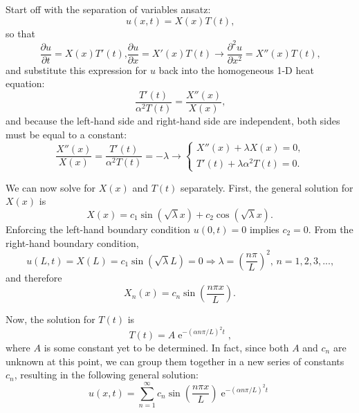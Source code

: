 \documentclass{article}
\begin{document}
Start off with the separation of variables ansatz:
\begin{equation}
u(x,t) = X(x)T(t)\text{,}
\end{equation}
so that
\begin{subequations}
\begin{equation}
\frac{\partial u}{\partial t} = X(x)T'(t)\text{,}
\end{equation}
\begin{equation}
\frac{\partial u}{\partial x} = X'(x)T(t)\rightarrow \frac{\partial^2 u}{\partial x^2} = X''(x)T(t)\text{,}
\end{equation}
\end{subequations}
and substitute this expression for $u$ back into the homogeneous 1-D heat equation:
\begin{equation}
\frac{T'(t)}{\alpha^2 T(t)} = \frac{X''(x)}{X(x)}\text{,}
\end{equation}
and because the left-hand side and right-hand side are independent, both sides must be equal to a constant:
\begin{equation}
\frac{X''(x)}{X(x)} = \frac{T'(t)}{\alpha^2 T(t)} = -\lambda \rightarrow
\begin{cases}
X''(x) + \lambda X(x) = 0\text{,}\\
T'(t) + \lambda \alpha^2 T(t) = 0\text{.}
\end{cases}
\end{equation}

We can now solve for $X(x)$ and $T(t)$ separately. First, the general solution for $X(x)$ is
\begin{equation}
X(x) = c_1\sin\left(\sqrt{\lambda}x\right) + c_2\cos\left(\sqrt{\lambda}x\right)\text{.}
\end{equation}
Enforcing the left-hand boundary condition $u(0,t) = 0$ implies $c_2 = 0$. From the right-hand boundary condition,
\begin{equation}
u(L,t) = X(L) = c_1\sin\left(\sqrt{\lambda}L\right) = 0\Rightarrow\lambda = \left(\frac{n\pi}{L}\right)^2\text{, }n = 1,2,3,...\text{,}
\end{equation}
and therefore
\begin{equation}
X_n(x) = c_n\sin\left(\frac{n\pi x}{L}\right)\text{.}
\end{equation}

Now, the solution for $T(t)$ is
\begin{equation}
T(t) = A\operatorname{e}^{-\left(\alpha n \pi/L\right)^2 t}\text{,}
\end{equation}
where $A$ is some constant yet to be determined.
In fact, since both $A$ and $c_n$ are unknown at this point, we can group them together in a new series of constants $c_n$, resulting in the following general solution:
\begin{equation}
\boxed{u(x,t) = \sum_{n=1}^{\infty} c_n\sin\left(\frac{n\pi x}{L}\right)\operatorname{e}^{-\left(\alpha n \pi/L\right)^2 t}}
\end{equation}
\end{document}
